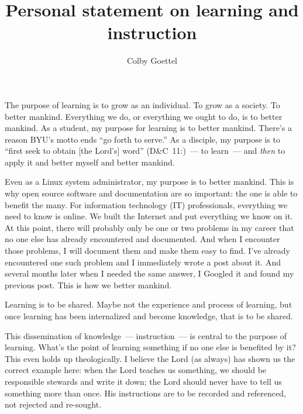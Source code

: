 \documentclass[man,natbib]{apa6}
\title{Personal statement on learning and instruction}
\author{Colby Goettel}
\affiliation{Brigham Young University}
\newcommand\vref[3]{(#1~#2\thinspace:\thinspace#3)}
\begin{document}
\maketitle

The purpose of learning is to grow as an individual. To grow as a society. To better mankind. Everything we do, or everything we ought to do, is to better mankind. As a student, my purpose for learning is to better mankind. There's a reason BYU's motto ends ``go forth to serve.'' As a disciple, my purpose is to ``first seek to obtain [the Lord's] word'' \vref{D\&C}{11}{21}~--- to learn~--- and \emph{then} to apply it and better myself and better mankind.

Even as a Linux system administrator, my purpose is to better mankind. This is why open source software and documentation are so important: the one is able to benefit the many. For information technology (IT) professionals, everything we need to know is online. We built the Internet and put everything we know on it. At this point, there will probably only be one or two problems in my career that no one else has already encountered and documented. And when I encounter those problems, I will document them and make them easy to find. I've already encountered one such problem and I immediately wrote a post about it. And several months later when I needed the same answer, I Googled it and found my previous post. This is how we better mankind.

Learning is to be shared. Maybe not the experience and process of learning, but once learning has been internalized and become knowledge, that is to be shared.

This dissemination of knowledge~--- instruction~--- is central to the purpose of learning. What's the point of learning something if no one else is benefited by it? This even holds up theologically. I believe the Lord (as always) has shown us the correct example here: when the Lord teaches us something, we should be responsible stewards and write it down; the Lord should never have to tell us something more than once. His instructions are to be recorded and referenced, not rejected and re-sought.

\end{document}
